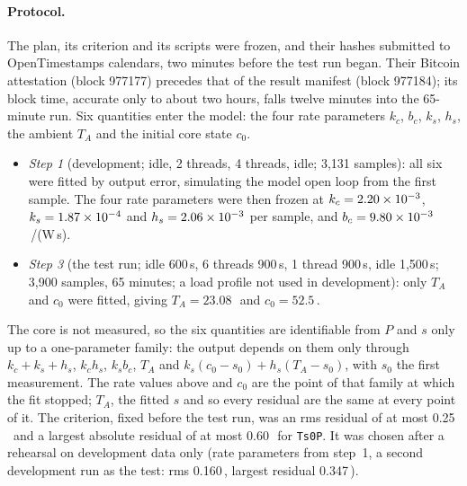 \paragraph{Protocol.} The plan, its criterion and its scripts were frozen, and their hashes submitted to
OpenTimestamps calendars, two minutes before the test run began. Their Bitcoin attestation (block 977177) precedes
that of the result manifest (block 977184); its block time, accurate only to about two hours, falls twelve minutes
into the 65-minute run. Six quantities enter the model: the four rate parameters
$k_c$, $b_c$, $k_s$, $h_s$, the ambient $T_A$ and the initial core state $c_0$.
\begin{itemize}
\item \emph{Step 1} (development; idle, 2 threads, 4 threads, idle; 3,131 samples): all six were fitted by output
  error, simulating the model open loop from the first sample. The four rate parameters were then frozen at
  $k_c = 2.20\times10^{-3}$, $k_s = 1.87\times10^{-4}$ and $h_s = 2.06\times10^{-3}$ per sample, and
  $b_c = 9.80\times10^{-3}$\,\degC/(W\,s).
\item \emph{Step 3} (the test run; idle 600\,s, 6 threads 900\,s, 1 thread 900\,s, idle 1,500\,s; 3,900 samples, 65
  minutes; a load profile not used in development): only $T_A$ and $c_0$ were fitted, giving $T_A = 23.08$\,\degC\ and
  $c_0 = 52.5$\,\degC.
\end{itemize}
The core is not measured, so the six quantities are identifiable from $P$ and $s$ only up to a one-parameter family:
the output depends on them only through $k_c+k_s+h_s$, $k_ch_s$, $k_sb_c$, $T_A$ and $k_s(c_0-s_0)+h_s(T_A-s_0)$, with
$s_0$ the first measurement. The rate values above and $c_0$ are the point of that family at which the fit stopped;
$T_A$, the fitted $s$ and so every residual are the same at every point of it.
The criterion, fixed before the test run, was an rms residual of at most 0.25\,\degC\ and a largest absolute residual
of at most 0.60\,\degC\ for \texttt{Ts0P}. It was chosen after a rehearsal on development data only (rate parameters
from step~1, a second development run as the test: rms 0.160\,\degC, largest residual 0.347\,\degC).

